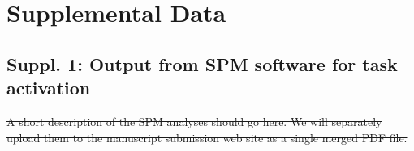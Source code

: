 \section*{Supplemental Data}
\subsection{Suppl. 1: Output from SPM software for task activation}
\sout{A short description of the SPM analyses should go here. We will separately upload them to the manuscript submission web site as a single merged PDF file.}
